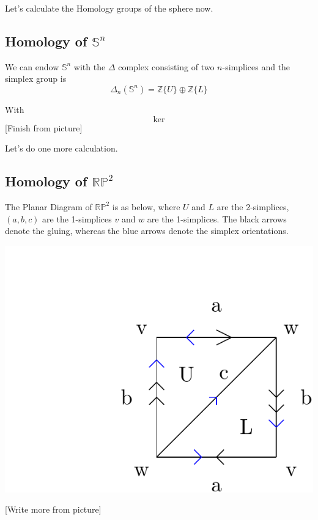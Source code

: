 \documentclass{article}
\begin{document}
\vskip 0.5cm
Let's calculate the Homology groups of the sphere now. 

\vskip 0.5cm
\subsection{Homology of $\mathbb{S}^n$}

\vskip 0.5cm
We can endow $\mathbb{S}^n$ with the $\Delta$ complex consisting of two $n$-simplices and the simplex group is 
\[ \Delta_n \left(\mathbb{S}^n\right) = \mathbb{Z}\{U\} \oplus \mathbb{Z}\{L\}  \]

With 
\[ \ker \]
[Finish from picture]

\vskip 0.5cm
Let's do one more calculation.

\vskip 1cm
\subsection{Homology of $\mathbb{RP}^2$}

\vskip 0.5cm
The Planar Diagram of $\mathbb{RP}^2$ is as below, where $U$ and $L$ are the 2-simplices, $(a, b, c)$ are the 1-simplices $v$ and $w$ are the 1-simplices. The black arrows denote the gluing, whereas the blue arrows denote the simplex orientations.

\begin{center}
  \includegraphics*[scale=0.50]{Homology of RP2.png}
\end{center}

\vskip 0.5cm
[Write more from picture]
\end{document}
